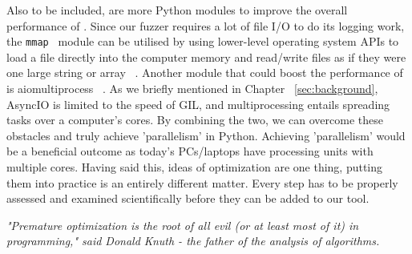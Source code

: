 Also to be included, are more Python modules to improve the overall performance of \pname{}. Since our fuzzer requires a lot of file I/O to do its logging work, the {\tt mmap } module can be utilised by using lower-level operating system APIs to load a file directly into the computer memory and read/write files as if they were one large string or array ~\cite{mmap}. Another module that could boost the performance of \pname{} is aiomultiprocess ~\cite{aiomultiprocess}. As we briefly mentioned in Chapter ~\ref{sec:background}, AsyncIO is limited to the speed of GIL, and multiprocessing entails spreading tasks over a computer's cores. By combining the two, we can overcome these obstacles and truly achieve 'parallelism' in Python. Achieving 'parallelism' would be a beneficial outcome as today's PCs/laptops have processing units with multiple cores.
Having said this, ideas of optimization are one thing, putting them into practice is an entirely different matter. Every step has to be properly assessed and examined scientifically before they can be added to our tool.

\textit{"Premature optimization is the root of all evil (or at least most of it) in programming," said Donald Knuth - the father of the analysis of algorithms.}